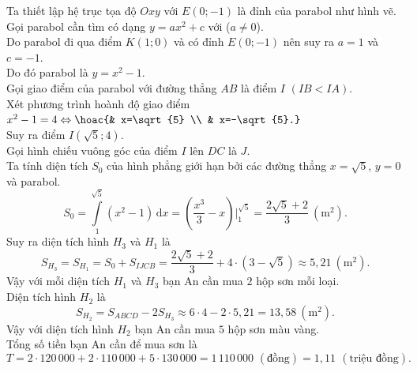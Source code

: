 \begin{ex}
{\begin{center}
\end{center}
Ta thiết lập hệ trục tọa độ $Oxy$ với $E(0;-1)$ là đỉnh của parabol như hình vẽ.\\
Gọi parabol cần tìm có dạng $y=ax^2+c$ với ($a\ne 0$).\\
Do parabol đi qua điểm $K(1;0)$ và có đỉnh $E(0;-1)$ nên suy ra $a=1$ và $c=-1$.\\
Do đó parabol là $y=x^2-1$.\\
Gọi giao điểm của parabol với đường thẳng $AB$ là điểm $I$ $ (IB<IA)$.\\
Xét phương trình hoành độ giao điểm $x^2-1=4\Leftrightarrow \hoac{& x=\sqrt{5} \\ & x=-\sqrt{5}.}$\\
Suy ra điểm $I\left(\sqrt{5};4\right)$.\\
Gọi hình chiếu vuông góc của điểm $I$ lên $DC$ là $J$.\\
Ta tính diện tích $S_0$ của hình phẳng giới hạn bởi các đường thẳng $x=\sqrt{5}$, $y=0$ và parabol.\\
\[S_0=\displaystyle\int\limits_1^{\sqrt{5}} \left( x^2-1\right) \mathrm{\,d}x=\left( \dfrac{x^3}{3}-x\right) \bigg|_1^{\sqrt{5}}=\dfrac{2\sqrt{5}+2}{3}\ (\text{m}^2).\]
Suy ra diện tích hình $H_3$ và $H_1$ là
\[S_{H_3}=S_{H_1}=S_0+S_{IJCB}=\dfrac{2\sqrt{5}+2}{3}+4\cdot \left(3-\sqrt{5} \right)\approx 5{,}21\ (\text{m}^2).\]
Vậy với mỗi diện tích $H_1$ và $H_3$ bạn An cần mua $2$ hộp sơn mỗi loại.\\
Diện tích hình $H_2$ là
\[S_{H_2}=S_{ABCD}-2S_{H_3}\approx 6\cdot 4-2\cdot 5{,}21=13{,}58\ (\text{m}^2).\]
Vậy với diện tích hình $H_2$ bạn An cần mua $5$ hộp sơn màu vàng.\\
Tổng số tiền bạn An cần để mua sơn là
\[T=2\cdot 120\,000 + 2\cdot 110\,000 + 5\cdot 130\,000=1\,110\,000\,\,(\text{đồng})=1{,}11\,\ (\text{triệu đồng}).\]
}
\end{ex}

